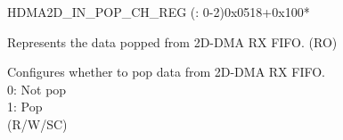 \begin{register}{H}{DMA2D\_IN\_POP\_CH\_REG (: 0-2)}{0x0518+0x100*}\label{regdesc:DMA2DINPOPCHNREG}
%
%
%
\regnewline%
\begin{regdesc}\begin{reglist}
\label{fielddesc:DMA2DINFIFORDATACHN}\item [DMA2D\_INFIFO\_RDATA\_CH\regindex{n}] Represents the data popped from 2D-DMA RX FIFO. (RO)
\label{fielddesc:DMA2DINFIFOPOPCHN}\item [DMA2D\_INFIFO\_POP\_CH\regindex{n}] Configures whether to pop data from 2D-DMA RX FIFO.\\
0: Not pop\\
1: Pop\\ (R/W/SC)
\end{reglist}\end{regdesc}
\end{register}


